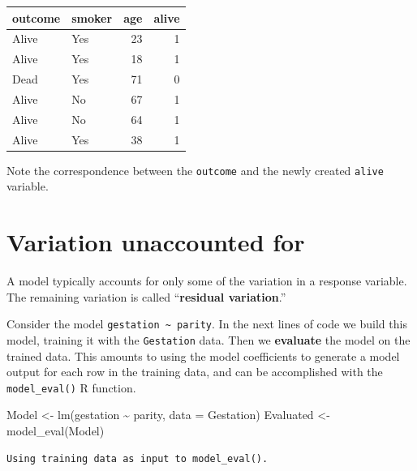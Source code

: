 \documentclass[
  letterpaper,
  DIV=11,
  numbers=noendperiod,
  oneside]{scrreprt}
\newenvironment{Shaded}{\begin{snugshade}}{\end{snugshade}}
\newcommand{\AttributeTok}[1]{\textcolor[rgb]{0.40,0.45,0.13}{#1}}
\newcommand{\FunctionTok}[1]{\textcolor[rgb]{0.28,0.35,0.67}{#1}}
\newcommand{\NormalTok}[1]{\textcolor[rgb]{0.00,0.23,0.31}{#1}}
\newcommand{\OtherTok}[1]{\textcolor[rgb]{0.00,0.23,0.31}{#1}}
\newcommand{\SpecialCharTok}[1]{\textcolor[rgb]{0.37,0.37,0.37}{#1}}
\begin{document}
\begin{tcolorbox}
\ttfamily 
\begin{tabular}{llrr}
\toprule
outcome & smoker & age & alive\\
\midrule
Alive & Yes & 23 & 1\\
Alive & Yes & 18 & 1\\
Dead & Yes & 71 & 0\\
Alive & No & 67 & 1\\
Alive & No & 64 & 1\\
\addlinespace
Alive & Yes & 38 & 1\\
\bottomrule
\end{tabular} \normalfont
\bigskip

Note the correspondence between the \texttt{outcome} and the newly
created \texttt{alive} variable.

\end{tcolorbox}

\hypertarget{variation-unaccounted-for}{%
\section{Variation unaccounted for}\label{variation-unaccounted-for}}

A model typically accounts for only some of the variation in a response
variable. The remaining variation is called ``\textbf{residual
variation}.''

Consider the model \texttt{gestation\ \textasciitilde{}\ parity}. In the
next lines of code we build this model, training it with the
\texttt{Gestation} data. Then we \textbf{evaluate} the model on the
trained data. This amounts to using the model coefficients to generate a
model output for each row in the training data, and can be accomplished
with the \texttt{model\_eval()} R function.

\begin{Shaded}
\begin{Highlighting}[]
\NormalTok{Model }\OtherTok{\textless{}{-}} \FunctionTok{lm}\NormalTok{(gestation }\SpecialCharTok{\textasciitilde{}}\NormalTok{ parity, }\AttributeTok{data =}\NormalTok{ Gestation)}
\NormalTok{Evaluated }\OtherTok{\textless{}{-}} \FunctionTok{model\_eval}\NormalTok{(Model)}
\end{Highlighting}
\end{Shaded}

\begin{verbatim}
Using training data as input to model_eval().
\end{verbatim}
\end{document}
